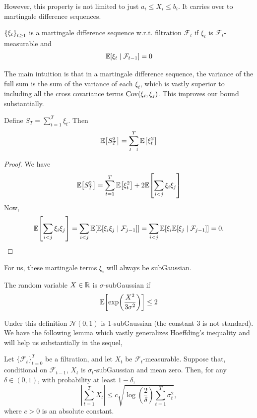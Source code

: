 However, this property is not limited to just $a_i \leq X_i \leq b_i$. It carries over to martingale difference sequences. 
\begin{definition}
    $\left\{\xi_t\right\}_{t\geq 1}$ is a martingale difference sequence w.r.t. filtration $\mathcal F_t$ if $\xi_t$ is $\mathcal F_t$-measurable and 
    \begin{align*}
        \mathbb{E}\qty[\xi_t \mid \mathcal F_{t-1}] = 0
    \end{align*}
\end{definition}
The main intuition is that in a martingale difference sequence, the variance of the full sum is the sum of the variance of each $\xi_t$, which is vastly superior to including all the cross covariance terms $\mathrm{Cov}\qty(\xi_i, \xi_j)$. This improves our bound substantially. 
\begin{lemma}
    Define $S_T = \sum_{t=1}^T \xi_t$. Then
    \begin{align*}
        \mathbb{E}\qty[S_T^2] = \sum_{t=1}^T \mathbb{E}\qty[\xi_t^2]
    \end{align*}
\end{lemma}
\begin{proof}
    We have
    \begin{align*}
        \mathbb{E}\qty[S_T^2] = \sum_{t=1}^T \mathbb{E}\qty[\xi_t^2] + 2\mathbb{E}\qty[\sum_{i < j} \xi_i \xi_j]
    \end{align*}
    Now,
    \begin{align*}
        \mathbb{E}\qty[\sum_{i < j} \xi_i \xi_j] = \sum_{i < j} \mathbb{E}\qty[\mathbb{E}\qty[\xi_i \xi_j \;\middle|\; \mathcal F_{j-1}]] = \sum_{i < j} \mathbb{E}\qty[\xi_i \mathbb{E}\qty[ \xi_j \;\middle|\; \mathcal F_{j-1}]] = 0.
    \end{align*}
\end{proof}

For us, these martingale terms $\xi_i$ will always be subGaussian.
\begin{definition}
    The random variable $X \in \mathbb{R}$ is $\sigma$-subGaussian if
    \begin{align*}
        \mathbb{E}\qty[\exp(\frac{X^2}{3\sigma^2})] \leq 2
    \end{align*}
\end{definition}
Under this definition $\mathcal N(0,1)$ is 1-subGaussian (the constant 3 is not standard). We have the following lemma which vastly generalizes Hoeffding's inequality and will help us substantially in the sequel,
\begin{lemma}
    Let $\{\mathcal F_t\}_{t=0}^T$ be a filtration, and let $X_t$ be
    $\mathcal F_t$-measurable. Suppose that, conditional on
    $\mathcal F_{t-1}$, $X_t$ is $\sigma_t$-subGaussian and mean zero.
    Then, for any $\delta\in(0,1)$, with probability at least $1-\delta$,
    \[
        \left|\sum_{t=1}^T X_t\right|
        \leq
        c\sqrt{
            \log\left(\frac{2}{\delta}\right)
            \sum_{t=1}^T \sigma_t^2
        },
    \]
    where $c>0$ is an absolute constant.
\end{lemma}

